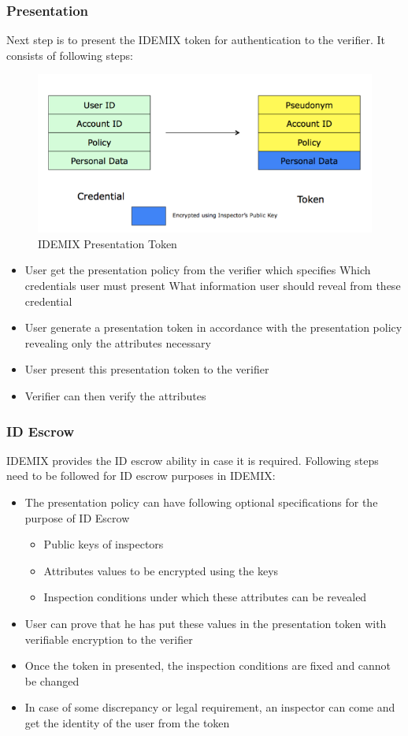 \subsubsection{Presentation}
Next step is to present the IDEMIX token for authentication to the verifier. It consists of following steps:
\begin{figure}[h]
	\centering
	\includegraphics[width=\textwidth]{figures/Token}
	\caption{IDEMIX Presentation Token}
	\label{fig:Token}
\end{figure}
\begin{itemize}
	\item User get the presentation policy from the verifier which specifies
		\subitem Which credentials user must present
		\subitem What information user should reveal from these credential
	\item User generate a presentation token in accordance with the presentation policy revealing only the attributes necessary
	\item User present this presentation token to the verifier
	\item Verifier can then verify the attributes
\end{itemize}
\subsubsection{ID Escrow}
IDEMIX provides the ID escrow ability in case it is required. Following steps need to be followed for ID escrow purposes in IDEMIX:
\begin{itemize}
	\item The presentation policy can have following optional specifications for the purpose of ID Escrow
	\begin{itemize}
		\item Public keys of inspectors
		\item Attributes values to be encrypted using the keys	
		\item Inspection conditions under which these attributes can be revealed
	\end{itemize}
	\item User can prove that he has put these values in the presentation token with verifiable encryption\cite{camenisch2003practical} to the verifier
	\item Once the token in presented, the inspection conditions are fixed and cannot be changed 
	\item In case of some discrepancy or legal requirement, an inspector can come and get the identity of the user from the token
\end{itemize}


